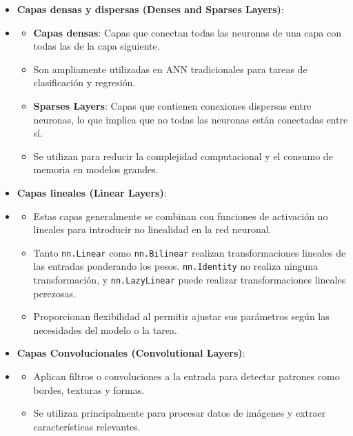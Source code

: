 \begin{itemize}
    \item \textbf{Capas densas y dispersas (Denses and Sparses Layers)}:
    \item[]
        \begin{itemize}
            \item \textbf{Capas densas}: Capas que conectan todas las neuronas de una capa con todas las de la capa siguiente.
            \item[] Son ampliamente utilizadas en \gls{ANN} tradicionales  para tareas de clasificación y regresión.
            \item \textbf{Sparses Layers}: Capas que contienen conexiones dispersas entre neuronas, lo que implica que no todas las neuronas están conectadas entre sí.
            \item[] Se utilizan para reducir la complejidad computacional y el consumo de memoria en modelos grandes.
        \end{itemize}
    \item \textbf{Capas lineales (Linear Layers)}:
    \item[]
        \begin{itemize}
            \item Estas capas generalmente se combinan con funciones de activación no lineales para introducir no linealidad en la red neuronal.
            \item Tanto \texttt{nn.Linear} como \texttt{nn.Bilinear} realizan transformaciones lineales de las entradas ponderando los pesos. \texttt{nn.Identity} no realiza ninguna transformación, y \texttt{nn.LazyLinear} puede realizar transformaciones lineales perezosas.
            \item Proporcionan flexibilidad al permitir ajustar sus parámetros según las necesidades del modelo o la tarea.
        \end{itemize}
    \item \textbf{Capas Convolucionales (Convolutional Layers)}:
    \item[]
        \begin{itemize}
            \item Aplican filtros o convoluciones a la entrada para detectar patrones como bordes, texturas y formas.
            \item Se utilizan principalmente para procesar datos de imágenes y extraer características relevantes.

\end{itemize}
\end{itemize}

